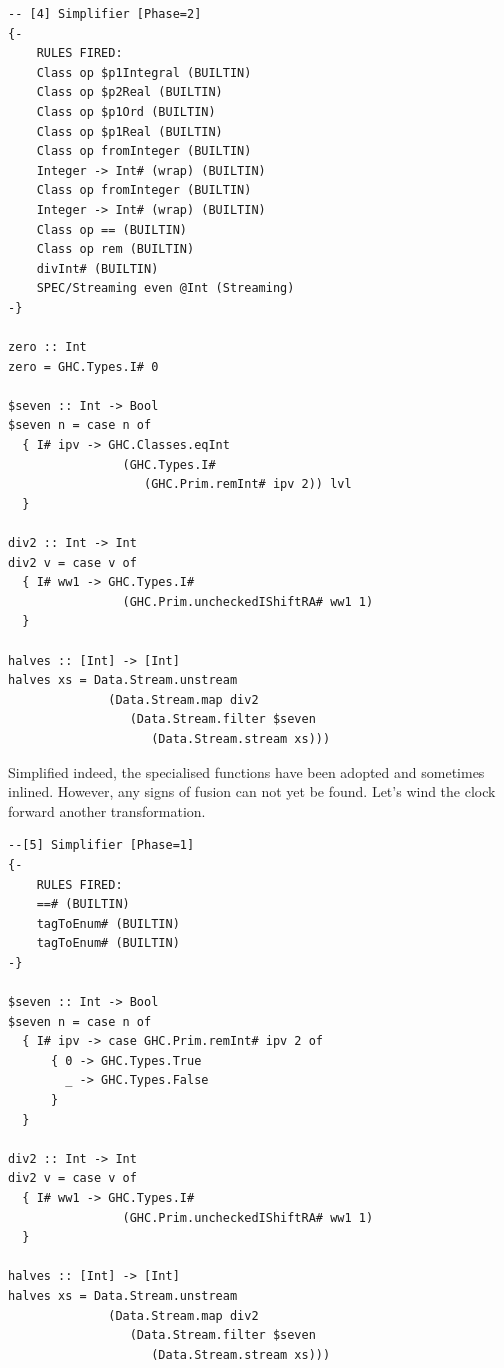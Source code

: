 \begin{listing}[H]
\begin{verbatim}
-- [4] Simplifier [Phase=2]
{-
    RULES FIRED:
    Class op $p1Integral (BUILTIN)
    Class op $p2Real (BUILTIN)
    Class op $p1Ord (BUILTIN)
    Class op $p1Real (BUILTIN)
    Class op fromInteger (BUILTIN)
    Integer -> Int# (wrap) (BUILTIN)
    Class op fromInteger (BUILTIN)
    Integer -> Int# (wrap) (BUILTIN)
    Class op == (BUILTIN)
    Class op rem (BUILTIN)
    divInt# (BUILTIN)
    SPEC/Streaming even @Int (Streaming)
-}

zero :: Int
zero = GHC.Types.I# 0

$seven :: Int -> Bool
$seven n = case n of
  { I# ipv -> GHC.Classes.eqInt
                (GHC.Types.I#
                   (GHC.Prim.remInt# ipv 2)) lvl
  }

div2 :: Int -> Int
div2 v = case v of
  { I# ww1 -> GHC.Types.I#
                (GHC.Prim.uncheckedIShiftRA# ww1 1)
  }

halves :: [Int] -> [Int]
halves xs = Data.Stream.unstream
              (Data.Stream.map div2
                 (Data.Stream.filter $seven
                    (Data.Stream.stream xs)))
\end{verbatim}
\end{listing}

Simplified indeed, the specialised functions have been adopted and sometimes inlined.
However, any signs of fusion can not yet be found. Let's wind the clock forward another
transformation.

\begin{listing}[H]
\begin{verbatim}
--[5] Simplifier [Phase=1]
{-
    RULES FIRED:
    ==# (BUILTIN)
    tagToEnum# (BUILTIN)
    tagToEnum# (BUILTIN)
-}

$seven :: Int -> Bool
$seven n = case n of
  { I# ipv -> case GHC.Prim.remInt# ipv 2 of
      { 0 -> GHC.Types.True
        _ -> GHC.Types.False
      }
  }

div2 :: Int -> Int
div2 v = case v of
  { I# ww1 -> GHC.Types.I#
                (GHC.Prim.uncheckedIShiftRA# ww1 1)
  }

halves :: [Int] -> [Int]
halves xs = Data.Stream.unstream
              (Data.Stream.map div2
                 (Data.Stream.filter $seven
                    (Data.Stream.stream xs)))
\end{verbatim}
\end{listing}

